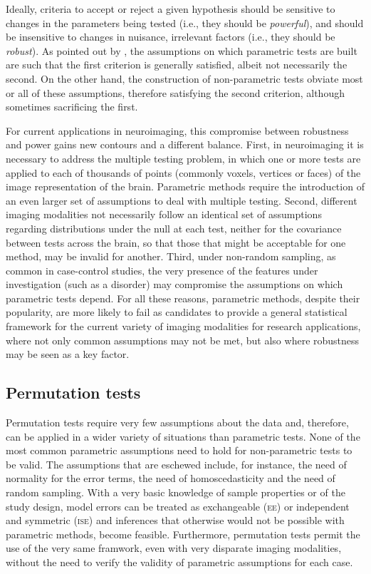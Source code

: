 Ideally, criteria to accept or reject a given hypothesis should be sensitive to changes in the parameters being tested (i.e., they should be \emph{powerful}), and should be insensitive to changes in nuisance, irrelevant factors (i.e., they should be \emph{robust}). As pointed out by \citet{Box1955}, the assumptions on which parametric tests are built are such that the first criterion is generally satisfied, albeit not necessarily the second. On the other hand, the construction of non-parametric tests obviate most or all of these assumptions, therefore satisfying the second criterion, although sometimes sacrificing the first.

For current applications in neuroimaging, this compromise between robustness and power gains new contours and a different balance. First, in neuroimaging it is necessary to address the multiple testing problem, in which one or more tests are applied to each of thousands of points (commonly voxels, vertices or faces) of the image representation of the brain. Parametric methods require the introduction of an even larger set of assumptions to deal with multiple testing. Second, different imaging modalities not necessarily follow an identical set of assumptions regarding distributions under the null at each test, neither for the covariance between tests across the brain, so that those that might be acceptable for one method, may be invalid for another. Third, under non-random sampling, as common in case-control studies, the very presence of the features under investigation (such as a disorder) may compromise the assumptions on which parametric tests depend. For all these reasons, parametric methods, despite their popularity, are more likely to fail as candidates to provide a general statistical framework for the current variety of imaging modalities for research applications, where not only common assumptions may not be met, but also where robustness may be seen as a key factor.

\subsection{Permutation tests}

Permutation tests require very few assumptions about the data and, therefore, can be applied in a wider variety of situations than parametric tests. None of the most common parametric assumptions need to hold for non-parametric tests to be valid. The assumptions that are eschewed include, for instance, the need of normality for the error terms, the need of homoscedasticity and the need of random sampling. With a very basic knowledge of sample properties or of the study design, model errors can be treated as exchangeable (\textsc{ee}) or independent and symmetric (\textsc{ise}) and inferences that otherwise would not be possible with parametric methods, become feasible. Furthermore, permutation tests permit the use of the very same framwork, even with very disparate imaging modalities, without the need to verify the validity of parametric assumptions for each case.

